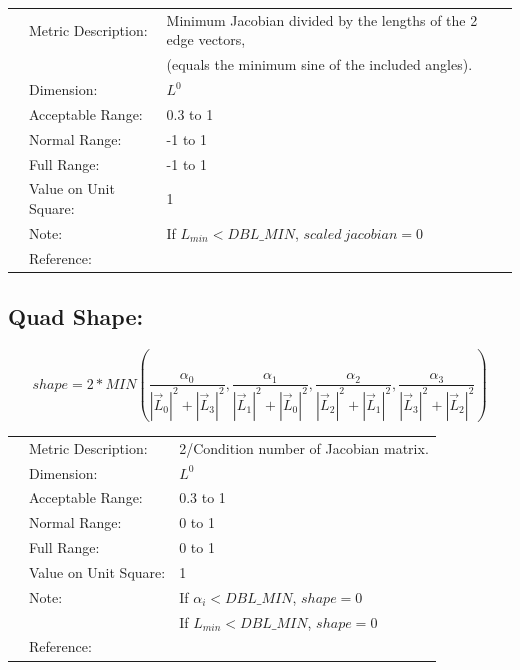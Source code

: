 \documentclass[12pt]{article}
\begin{document}
\begin{tabular}{lll}
& Metric Description:  & Minimum Jacobian divided by the lengths of the 2 edge vectors, \\
&                      & (equals the minimum sine of the included angles). \\
& Dimension:           & $L^0$  \\ 
& Acceptable Range:    & 0.3 to 1 \\ 
& Normal Range:        & -1 to 1 \\ 
& Full Range:          & -1 to 1 \\ 
& Value on Unit Square:& 1 \\
& Note:                & If $L_{min} < DBL\_MIN$, $scaled~jacobian = 0$ \\
& Reference:           &  \cite{three} \\
\end{tabular} 

\subsection*{Quad Shape:}

\begin{displaymath}
shape = 2*MIN \left( \frac {\alpha_0} { |\vec L_0|^2 + |\vec L_3|^2 }, 
                     \frac {\alpha_1} { |\vec L_1|^2 + |\vec L_0|^2 }, 
                     \frac {\alpha_2} { |\vec L_2|^2 + |\vec L_1|^2 }, 
                     \frac {\alpha_3} { |\vec L_3|^2 + |\vec L_2|^2 }
\right) 
\end{displaymath}

\begin{tabular}{lll}
& Metric Description:  & 2/Condition number of Jacobian matrix. \\
& Dimension:           & $L^0$  \\ 
& Acceptable Range:    & 0.3 to 1 \\ 
& Normal Range:        & 0 to 1\\ 
& Full Range:          & 0 to 1\\ 
& Value on Unit Square:& 1 \\
& Note:                & If $\alpha_i < DBL\_MIN$, $shape = 0$ \\
&                      & If $L_{min} < DBL\_MIN$, $shape = 0$ \\
& Reference:           &  \cite{four} \\
\end{tabular} 
\end{document}
